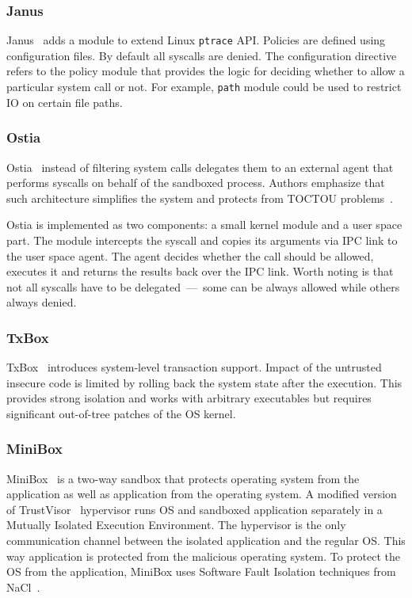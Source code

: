 \documentclass[en]{pracamgr}
\begin{document}
\subsubsection{Janus}
Janus~\cite{garfinkel2004janus} adds a module to extend Linux \texttt{ptrace} API. Policies are defined using configuration files. By default all syscalls are denied. The configuration directive refers to the policy module that provides the logic for deciding whether to allow a particular system call or not. For example, \texttt{path} module could be used to restrict IO on certain file paths.

\subsubsection{Ostia}
Ostia~\cite{garfinkel2004ostia} instead of filtering system calls delegates them to an external agent that performs syscalls on behalf of the sandboxed process. Authors emphasize that such architecture simplifies the system and protects from TOCTOU problems~\cite{cwe_toctou}.

Ostia is implemented as two components: a small kernel module and a user space part. The module intercepts the syscall and copies its arguments via IPC link to the user space agent. The agent decides whether the call should be allowed, executes it and returns the results back over the IPC link. Worth noting is that not all syscalls have to be delegated~---~some can be always allowed while others always denied.

\subsubsection{TxBox}
TxBox~\cite{jana2011txbox} introduces system-level transaction support. Impact of the untrusted insecure code is limited by rolling back the system state after the execution. This provides strong isolation and works with arbitrary executables but requires significant out-of-tree patches of the OS kernel.

\subsubsection{MiniBox}
MiniBox~\cite{li2014minibox} is a two-way sandbox that protects operating system from the application as well as application from the operating system. A modified version of TrustVisor~\cite{mccune2010trustvisor} hypervisor runs OS and sandboxed application separately in a Mutually Isolated Execution Environment. The hypervisor is the only communication channel between the isolated application and the regular OS. This way application is protected from the malicious operating system. To protect the OS from the application, MiniBox uses Software Fault Isolation techniques from NaCl~\cite{yee2010native}.
\end{document}

